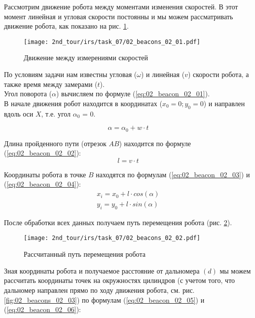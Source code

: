 \solutionSection

Рассмотрим движение робота между моментами изменения скоростей. В этот момент линейная и угловая скорости постоянны и мы можем рассматривать движение робота, как показано на рис. \ref{fig:02_beacons_02_01}.

\begin{figure}[h!]
	\centering
	\texttt{[image: 2nd\_tour/irs/task\_07/02\_beacons\_02\_01.pdf]}
	\caption{Движение между измерениями скоростей}
	\label{fig:02_beacons_02_01}
\end{figure}

По условиям задачи нам известны угловая ($\omega$) и линейная ($v$) скорости робота, а также время между замерами ($t$).\\
Угол поворота ($\alpha$) вычисляем по формуле (\ref{eq:02_beacon_02_01}). \\
В начале движения робот находится в координатах ($x_0 = 0; y_0 = 0$) и направлен вдоль оси $X$, т.е. угол $\alpha_0$ = 0.

\begin{equation}
\alpha = \alpha_0 + w \cdot t
\label{eq:02_beacon_02_01}
\end{equation}

Длина пройденного пути (отрезок $AB$) находится по формуле (\ref{eq:02_beacon_02_02}):
\begin{equation}
l = v \cdot t
\label{eq:02_beacon_02_02}
\end{equation}

Координаты робота в точке $B$ находятся по формулам (\ref{eq:02_beacon_02_03}) и (\ref{eq:02_beacon_02_04}):
\begin{eqnarray}
x_i = x_0 + l \cdot cos(\alpha)
\label{eq:02_beacon_02_03}\\
y_i = y_0 + l \cdot sin(\alpha)
\label{eq:02_beacon_02_04}
\end{eqnarray}

После обработки всех данных получаем путь перемещения робота (рис. \ref{fig:02_beacons_02_02}).
\begin{figure}[h!]
	\centering
	\texttt{[image: 2nd\_tour/irs/task\_07/02\_beacons\_02\_02.pdf]}
	\caption{Рассчитанный путь перемещения робота}
	\label{fig:02_beacons_02_02}
\end{figure}


Зная координаты робота и получаемое расстояние от дальномера $(d)$ мы можем рассчитать координаты точек на окружностях цилиндров (с учетом того, что дальномер направлен прямо по ходу движения робота, см. рис. \ref{fig:02_beacons_02_03}) по формулам (\ref{eq:02_beacon_02_05}) и (\ref{eq:02_beacon_02_06}):

